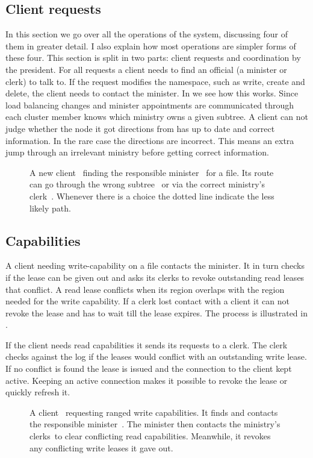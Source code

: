 \subsection{Client requests}
In this section we go over all the operations of the system, discussing four of them in greater detail. I also explain how most operations are simpler forms of these four. This section is split in two parts: client requests and coordination by the president.
%
For all requests a client needs to find an official (a minister or clerk) to talk to. If the request modifies the namespace, such as write, create and delete, the client needs to contact the minister. In  we see how this works. Since load balancing changes and minister appointments are communicated through \raft{} each cluster member knows which ministry owns a given subtree. A client can not judge whether the node it got directions from has up to date and correct information. In the rare case the directions are incorrect. This means an extra jump through an irrelevant ministry before getting correct information.
%
\begin{figure}[htbp]
	\centering
	
	\caption{A new client~\clientLeg{} finding the responsible minister~\amdsLeg{} for a file. Its route can go through the wrong subtree~\umdsLeg{} or via the correct ministry's clerk~\cmdsLeg{}. Whenever there is a choice the dotted line indicate the less likely path.}
	\label{fig:find_aMDS}
\end{figure}
%
\subsection*{Capabilities} \label{sec:lease}
A client needing write-capability on a file contacts the minister. It in turn checks if the lease can be given out and asks its clerks to revoke outstanding read leases that conflict. A read lease conflicts when its region overlaps with the region needed for the write capability. If a clerk lost contact with a client it can not revoke the lease and has to wait till the lease expires. The process is illustrated in . 

If the client needs read capabilities it sends its requests to a clerk. The clerk checks against the \raft{} log if the leases would conflict with an outstanding write lease. If no conflict is found the lease is issued and the connection to the client kept active. Keeping an active connection makes it possible to revoke the lease or quickly refresh it.
%
\begin{figure}[htbp]
	\centering
	
	\caption{A client~\clientLeg{} requesting ranged write capabilities. It finds and contacts the responsible minister~\amdsLeg{}. The minister then contacts the ministry's clerks~\cmdsLeg to clear conflicting read capabilities. Meanwhile, it revokes any conflicting write leases it gave out.}
	\label{fig:write}
\end{figure}
%
